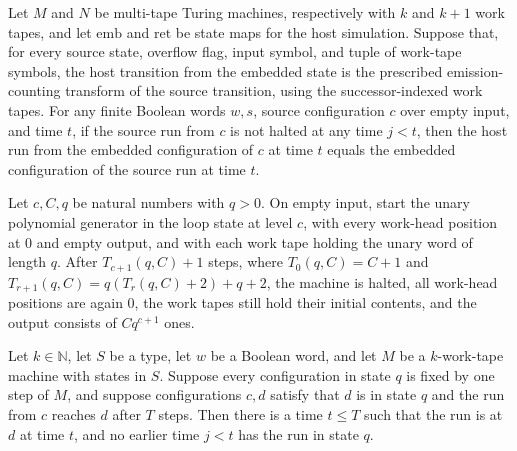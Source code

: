 \begin{lemma}
\label{Turing.FinTM.splitCount_run}
\leanok
{}
Let $M$ and $N$ be multi-tape Turing machines, respectively with $k$ and $k+1$ work
tapes, and let $\mathrm{emb}$ and $\mathrm{ret}$ be state maps for the host simulation.
Suppose that, for every source state, overflow flag, input symbol, and tuple of
work-tape symbols, the host transition from the embedded state is the prescribed
emission-counting transform of the source transition, using the successor-indexed work
tapes. For any finite Boolean words $w,s$, source configuration $c$ over empty input,
and time $t$, if the source run from $c$ is not halted at any time $j<t$, then the host
run from the embedded configuration of $c$ at time $t$ equals the embedded configuration
of the source run at time $t$.
\end{lemma}

\begin{lemma}
\label{Turing.FinTM.splitPoly_loop_end}
\leanok
{}
Let $c,C,q$ be natural numbers with $q>0$. On empty input, start the unary polynomial
generator in the loop state at level $c$, with every work-head position at $0$ and empty
output, and with each work tape holding the unary word of length $q$. After
$T_{c+1}(q,C)+1$ steps, where $T_0(q,C)=C+1$ and $T_{r+1}(q,C)=q(T_r(q,C)+2)+q+2$, the
machine is halted, all work-head positions are again $0$, the work tapes still hold
their initial contents, and the output consists of $Cq^{c+1}$ ones.
\end{lemma}

\begin{lemma}
\label{Turing.FinTM.catalogFirstEntry}
\leanok
{}
Let $k\in\mathbb N$, let $S$ be a type, let $w$ be a Boolean word, and let $M$ be a
$k$-work-tape machine with states in $S$. Suppose every configuration in state $q$ is
fixed by one step of $M$, and suppose configurations $c,d$ satisfy that $d$ is in state
$q$ and the run from $c$ reaches $d$ after $T$ steps. Then there is a time $t\le T$ such
that the run is at $d$ at time $t$, and no earlier time $j<t$ has the run in state $q$.
\end{lemma}

